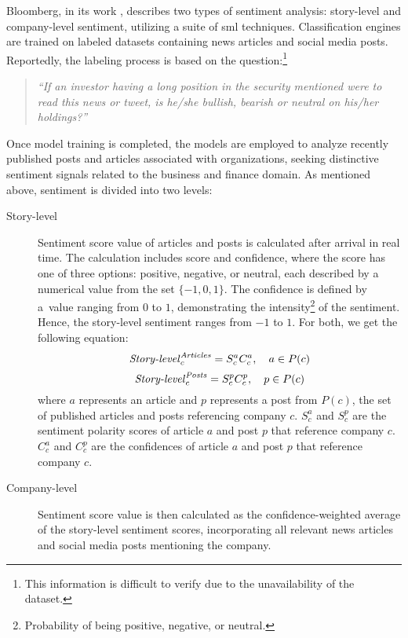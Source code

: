 Bloomberg, in its work \parencite{bloomberg}, describes two types of sentiment analysis: story-level and company-level sentiment, utilizing a suite of \acrfull{sml} techniques. Classification engines are trained on labeled datasets containing news articles and social media posts. Reportedly, the labeling process is based on the question:\footnote{This information is difficult to verify due to the unavailability of the dataset.} \begin{quote}
    \textit{``If an investor having a long position in the security mentioned were to read this news or tweet, is he/she bullish, bearish or neutral on his/her holdings?''}
\end{quote} Once model training is completed, the models are employed to analyze recently published posts and articles associated with organizations, seeking distinctive sentiment signals related to the business and finance domain. As mentioned above, sentiment is divided into two levels:\begin{description}
    \item[Story-level] Sentiment score value of articles and posts is calculated after arrival in real time. The calculation includes score and confidence, where the score has one of three options: positive, negative, or neutral, each described by a numerical value from the set $\{-1, 0, 1\}$. The confidence is defined by a~value ranging from $0$ to $1$, demonstrating the intensity\footnote{Probability of being positive, negative, or neutral.} of the sentiment. Hence, the story-level sentiment ranges from $-1$ to $1$. For both, we get the following equation:
    \begin{equation}
    \label{eq:story-level-article-sentiment}
    \text{\textit{Story-level}}_{c}^{\text{\textit{Articles}}} = S_{c}^{a} C_{c}^{a}, \quad a \in P(c)
    \end{equation}
    \begin{equation}
    \label{eq:story-level-post-sentiment}
    \text{\textit{Story-level}}_{c}^{\text{\textit{Posts}}} = S_{c}^{p} C_{c}^{p}, \quad p \in P(c)
    \end{equation} where $a$ represents an article and $p$ represents a post from $P(c)$, the set of published articles and posts referencing company $c$. $S_{c}^{a}$ and $S_{c}^{p}$ are the sentiment polarity scores of article $a$ and post $p$ that reference company $c$. $C_{c}^{a}$ and $C_{c}^{p}$ are the confidences of article $a$ and post $p$ that reference company $c$.
    \item[Company-level] Sentiment score value is then calculated as the confidence-weighted average of the story-level sentiment scores, incorporating all relevant news articles and social media posts mentioning the company.

\end{description}
